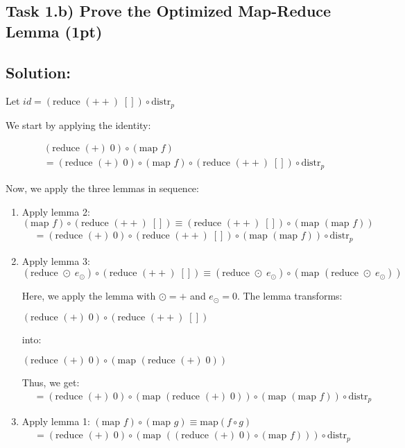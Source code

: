 \documentclass{article}
\begin{document}
\subsection{Task 1.b) Prove the Optimized Map-Reduce Lemma (1pt)}

\subsection*{Solution:}

Let $id = (\text{reduce } (++) \; []) \circ \text{distr}_p$

We start by applying the identity:

\begin{align*}
&(\text{reduce } (+) \; 0) \circ (\text{map } f) \\
&= (\text{reduce } (+) \; 0) \circ (\text{map } f) \circ  (\text{reduce } (++) \; []) \circ \text{distr}_p
\end{align*}

Now, we apply the three lemmas in sequence:

\begin{enumerate}
    \item Apply lemma 2: $(\text{map } f) \circ (\text{reduce } (++)\; []) \equiv (\text{reduce } (++) \; []) \circ (\text{map } (\text{map } f))$
    \begin{align*}
    &= (\text{reduce } (+) \; 0) \circ (\text{reduce } (++) \; []) \circ (\text{map } (\text{map } f)) \circ \text{distr}_p
    \end{align*}

    \item Apply lemma 3: $(\text{reduce } \odot\; e_\odot) \circ (\text{reduce } (++)\; []) \equiv (\text{reduce } \odot\; e_\odot) \circ (\text{map } (\text{reduce } \odot\; e_\odot))$
    
    Here, we apply the lemma with $\odot = +$ and $e_\odot = 0$. The lemma transforms:
    
    $(\text{reduce } (+) \; 0) \circ (\text{reduce } (++) \; [])$
    
    into:
    
    $(\text{reduce } (+) \; 0) \circ (\text{map } (\text{reduce } (+) \; 0))$
    
    Thus, we get:
    \begin{align*}
    &= (\text{reduce } (+) \; 0) \circ (\text{map } (\text{reduce } (+) \; 0)) \circ (\text{map } (\text{map } f)) \circ \text{distr}_p
    \end{align*}

    \item Apply lemma 1: $(\text{map } f) \circ (\text{map } g) \equiv \text{map}(f \circ g)$
    \begin{align*}
    &= (\text{reduce } (+) \; 0) \circ (\text{map } ((\text{reduce } (+) \; 0) \circ (\text{map } f))) \circ \text{distr}_p
    \end{align*}
\end{enumerate}
\end{document}
